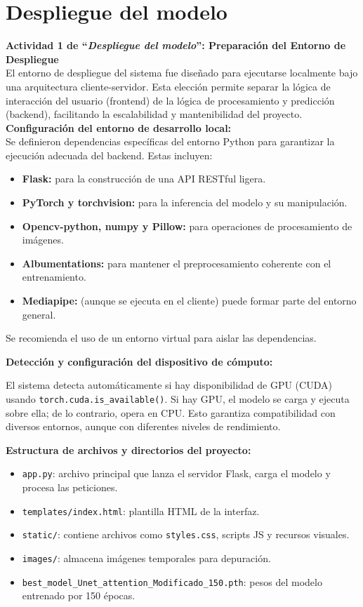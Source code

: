 \section{Despliegue del modelo}
\textbf{Actividad 1 de “\textit{Despliegue del modelo}”: Preparación del Entorno de Despliegue}
\\
El entorno de despliegue del sistema fue diseñado para ejecutarse localmente bajo una arquitectura cliente-servidor. Esta elección permite separar la lógica de interacción del usuario (frontend) de la lógica de procesamiento y predicción (backend), facilitando la escalabilidad y mantenibilidad del proyecto.
\\
\textbf{Configuración del entorno de desarrollo local:}
\\
Se definieron dependencias específicas del entorno Python para garantizar la ejecución adecuada del backend. Estas incluyen:
\begin{itemize}
\item \textbf{Flask:} para la construcción de una API RESTful ligera.
\item \textbf{PyTorch y torchvision:} para la inferencia del modelo y su manipulación.
\item \textbf{Opencv-python, numpy y Pillow:} para operaciones de procesamiento de imágenes.
\item \textbf{Albumentations:} para mantener el preprocesamiento coherente con el entrenamiento.
\item \textbf{Mediapipe:} (aunque se ejecuta en el cliente) puede formar parte del entorno general.
\end{itemize}
Se recomienda el uso de un entorno virtual para aislar las dependencias.

\textbf{Detección y configuración del dispositivo de cómputo:}

El sistema detecta automáticamente si hay disponibilidad de GPU (CUDA) usando \texttt{torch.cuda.is\_available()}. Si hay GPU, el modelo se carga y ejecuta sobre ella; de lo contrario, opera en CPU. Esto garantiza compatibilidad con diversos entornos, aunque con diferentes niveles de rendimiento.

\vspace{0.5em}
\textbf{Estructura de archivos y directorios del proyecto:}

\begin{itemize}
    \item \texttt{app.py}: archivo principal que lanza el servidor Flask, carga el modelo y procesa las peticiones.
    \item \texttt{templates/index.html}: plantilla HTML de la interfaz.
    \item \texttt{static/}: contiene archivos como \texttt{styles.css}, scripts JS y recursos visuales.
    \item \texttt{images/}: almacena imágenes temporales para depuración.
    \item \texttt{best\_model\_Unet\_attention\_Modificado\_150.pth}: pesos del modelo entrenado por 150 épocas.
\end{itemize}

